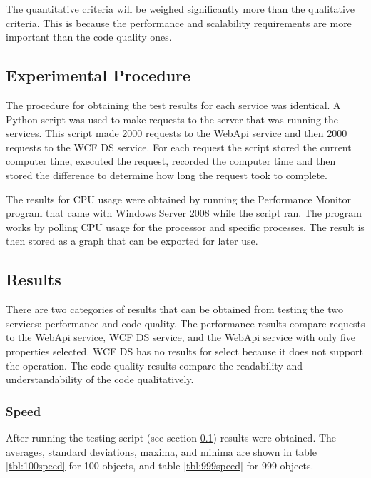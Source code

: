 \documentclass[se]{uw-wkrpt}
\begin{document}
The quantitative criteria will be weighed significantly more than the qualitative criteria. This is because the performance and scalability requirements are more important than the code quality ones.

\subsection{Experimental Procedure}\label{subsec:proc}

The procedure for obtaining the test results for each service was identical. A Python script was used to make requests to the server that was running the services. This script made 2000 requests to the WebApi service and then 2000 requests to the WCF DS service. For each request the script stored the current computer time, executed the request, recorded the computer time and then stored the difference to determine how long the request took to complete.

The results for CPU usage were obtained by running the Performance Monitor program that came with Windows Server 2008 while the script ran. The program works by polling CPU usage for the processor and specific processes. The result is then stored as a graph that can be exported for later use. 

\subsection{Results}

There are two categories of results that can be obtained from testing the two services: performance and code quality. The performance results compare requests to the WebApi service, WCF DS service, and the WebApi service with only five properties selected. WCF DS has no results for select because it does not support the operation. The code quality results compare the readability and understandability of the code qualitatively.

\subsubsection{Speed}

After running the testing script (see section \ref{subsec:proc}) results were obtained. The averages, standard deviations, maxima, and minima are shown in table \ref{tbl:100speed} for 100 objects, and table \ref{tbl:999speed} for 999 objects. 
\end{document}
